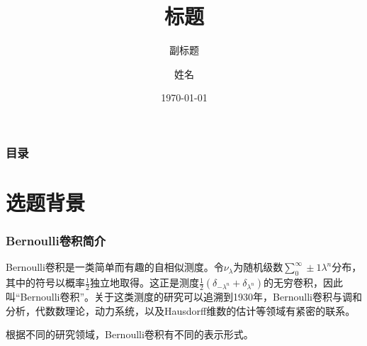 \documentclass{beamer}
\title[开题答辩]{标题} %
\subtitle{副标题}
\author{姓名}
\institute[HZAU]{华中农业大学}
\date{\today}
\numberwithin{equation}{section}
\theoremstyle{definition} \newtheorem{law}[thm]{Law}
\theoremstyle{plain} \newtheorem{jury}[thm]{Jury}
\theoremstyle{remark} \newtheorem*{marg}{Margaret}
\newcommand{\pmone}{\pm1}
\begin{document}
\begin{frame}
	\titlepage %
\end{frame}


\begin{frame}
	\frametitle{目录} %
	\tableofcontents %
\end{frame}


\section{选题背景} %


\begin{frame}
	\frametitle{Bernoulli卷积简介}\small
	Bernoulli卷积是一类简单而有趣的自相似测度。令$ \nu_{\lambda} $为随机级数$ \sum_{0}^{\infty} \pmone\lambda^{n} $分布，其中的符号以概率$ \frac{1}{2} $独立地取得。这正是测度$ \frac{1}{2}(\delta_{-\lambda^{n}}+\delta_{\lambda^{n}}) $的无穷卷积，因此叫``Bernoulli卷积''。关于这类测度的研究可以追溯到1930年，Bernoulli卷积与调和分析，代数数理论，动力系统，以及Hausdorff维数的估计等领域有紧密的联系。


	根据不同的研究领域，Bernoulli卷积有不同的表示形式。\cite{Sixtyyears}

\end{frame}
\end{document}
